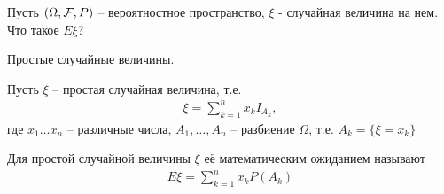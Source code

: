 Пусть $(\Omega, \mathcal{F}, P)$ -- вероятностное пространство, $\xi$ - случайная величина на нем. 
Что такое $E \xi$?

Простые случайные величины.

Пусть $\xi$ -- простая случайная величина, т.е. 
\begin{align*}
  \xi = \sum_{k = 1}^{n} x_k I_{A_k},
\end{align*}
где $x_1 \ldots x_n$ -- различные числа, $A_1, \ldots, A_n$ 
-- разбиение $\Omega$, т.е. $A_k = \{ \xi = x_k \}$

\begin{definition}
  Для простой случайной величины $\xi$ её математическим ожиданием называют
  \begin{align*}
    E\xi = \sum_{k = 1}^n x_k P(A_k)
  \end{align*}
\end{definition}


